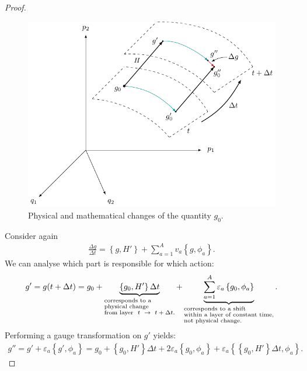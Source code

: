 \begin{proof}
\begin{figure}[H]
\begin{center}
\includegraphics[scale=1.1]{img/gauge3.pdf}
\end{center}
\caption{Physical and mathematical changes of the quantity $g_0$.}
\label{fig:5}
\end{figure}
Consider again
\begin{align}
\frac{\Delta g}{\Delta t} = \left\{ g , H' \right \} + \sum_{a=1}^A v_a \left\{ g , \phi_a \right \}.
\end{align}
We can analyse which part is responsible for which action:
\begin{align}
g' = g(t + \Delta t) = g_0 + \underbrace{\left\{ g_0 , H' \right \} \Delta t}_{\begin{subarray}{l}\text{corresponds to a}\\ \text{physical change}\\
    \text{from layer \ $t \ \rightarrow \ t + \Delta t$.}\end{subarray}}
+ \underbrace{\sum_{a=1}^A \varepsilon_a \left\{ g_0 , \phi_a \right \}}_{\begin{subarray}{2}\text{corresponds to a shift}\\
    \text{within a layer of constant time,}\\
    \text{not physical change.}\end{subarray}}.
\end{align}
Performing a gauge transformation on $g'$ yields:
\begin{align}
g'' = g' + \varepsilon_a \left\{ g' , \phi_a \right \} = g_0 + \left\{ g_0 , H' \right \} \Delta t + 2 \varepsilon_a \left\{ g_0 , \phi_a \right \} + \varepsilon_a \left\{ \left\{ g_0 , H' \right \} \Delta t, \phi_a \right\}.

\end{align}
\end{proof}
